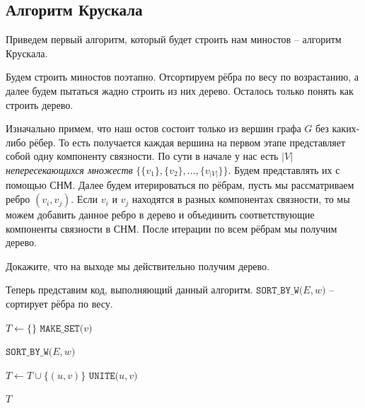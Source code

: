 \subsection{Алгоритм Крускала}

Приведем первый алгоритм, который будет строить нам миностов -- алгоритм Крускала.

Будем строить миностов поэтапно. Отсортируем рёбра по весу по возрастанию, а далее будем пытаться жадно строить из них дерево.
Осталось только понять как строить дерево.

Изначально примем, что наш остов состоит только из вершин графа $G$ без каких-либо рёбер.
То есть получается каждая вершина на первом этапе представляет собой одну компоненту связности.
По сути в начале у нас есть $|V|$ \textit{непересекающихся множеств} $\{\{v_1\}, \{v_2\}, \dots, \{v_{|V|}\} \}$. Будем представлять их с помощью СНМ.
Далее будем итерироваться по рёбрам, пусть мы рассматриваем ребро $(v_i, v_j)$. 
Если $v_i$ и $v_j$ находятся в разных компонентах связности, то мы можем добавить данное ребро в дерево и объединить соответствующие компоненты связности в СНМ.
После итерации по всем рёбрам мы получим дерево.

\Exe Докажите, что на выходе мы действительно получим дерево.

Теперь представим код, выполняющий данный алгоритм. $\texttt{SORT\_BY\_W(}E, w\texttt{)}$ -- сортирует рёбра по весу.

\begin{algorithm}[H]
\caption{Алгоритм Крускала}
\begin{algorithmic}[1]

    \State $T \gets \{\}$
        \State $\texttt{MAKE\_SET(}v\texttt{)}$
    \EndFor

    \State $\texttt{SORT\_BY\_W(}E, w\texttt{)}$
    
            \State $T \gets T \cup \{(u, v)\}$
            \State $\texttt{UNITE(}u, v\texttt{)}$
        \EndIf
    \EndFor

    \State \Return $T$
\EndFunction
\end{algorithmic}
\end{algorithm}

